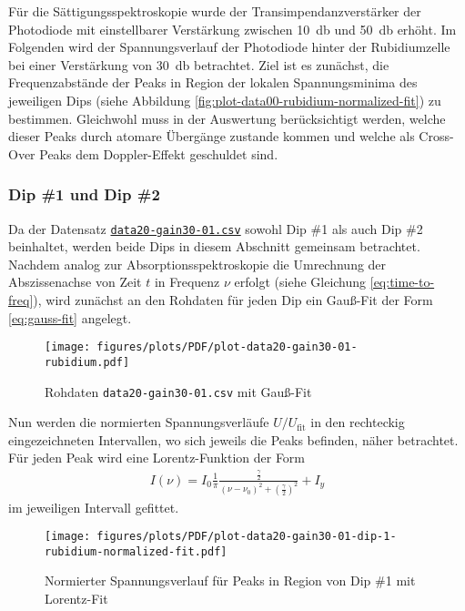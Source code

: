 \noindent Für die Sättigungsspektroskopie wurde der Transimpendanzverstärker der Photodiode mit einstellbarer Verstärkung zwischen \SI{10}{\decibel} und \SI{50}{\decibel} erhöht. Im Folgenden wird der Spannungsverlauf der Photodiode hinter der Rubidiumzelle bei einer Verstärkung von \SI{30}{\decibel} betrachtet.
Ziel ist es zunächst, die Frequenzabstände der Peaks in Region der lokalen Spannungsminima des jeweiligen Dips (siehe Abbildung \ref{fig:plot-data00-rubidium-normalized-fit}) zu bestimmen. Gleichwohl muss in der Auswertung berücksichtigt werden, welche dieser Peaks durch atomare Übergänge zustande kommen und welche als Cross-Over Peaks dem Doppler-Effekt geschuldet sind.

\subsubsection{Dip \textcolor{red!80!black}{\#1} und Dip \textcolor{green!50!black}{\#2}}

Da der Datensatz \href{https://github.com/DaHaCoder/H2-Auswertung/blob/main/data/data20-gain30-01.csv}{\lstinline{data20-gain30-01.csv}} sowohl Dip \textcolor{red!80!black}{\#1} als auch Dip \textcolor{green!50!black}{\#2} beinhaltet, werden beide Dips in diesem Abschnitt gemeinsam betrachtet.
Nachdem analog zur Absorptionsspektroskopie die Umrechnung der Abszissenachse von Zeit $t$ in Frequenz $\nu$ erfolgt (siehe Gleichung \eqref{eq:time-to-freq}), wird zunächst an den Rohdaten für jeden Dip ein Gauß-Fit der Form \eqref{eq:gauss-fit} angelegt. 

\begin{figure}[!h]
    \centering
    \texttt{[image: figures/plots/PDF/plot-data20-gain30-01-rubidium.pdf]}
    \caption{Rohdaten \lstinline{data20-gain30-01.csv} mit Gauß-Fit}
    \label{fig:plot-data20-gain30-01-rubidium}
\end{figure}

\noindent Nun werden die normierten Spannungsverläufe $U/U_{\text{fit}}$ in den rechteckig eingezeichneten Intervallen, wo sich jeweils die Peaks befinden, näher betrachtet. Für jeden Peak wird eine Lorentz-Funktion der Form
\begin{align}
    I(\nu) = I_{0} \frac{1}{\pi} \frac{\frac{\gamma}{2}}{ (\nu - \nu_{0})^2 + (\frac{\gamma}{2})^2} + I_{y}
    \label{eq:lorentz-fit}
\end{align}
im jeweiligen Intervall gefittet.

\begin{figure}[H]
    \centering
    \texttt{[image: figures/plots/PDF/plot-data20-gain30-01-dip-1-rubidium-normalized-fit.pdf]}
    \caption{Normierter Spannungsverlauf für Peaks in Region von Dip \textcolor{red!80!black}{\#1} mit Lorentz-Fit}
    \label{fig:plot-data20-gain30-01-dip-1-rubidium-normalized-fit}
\end{figure}

